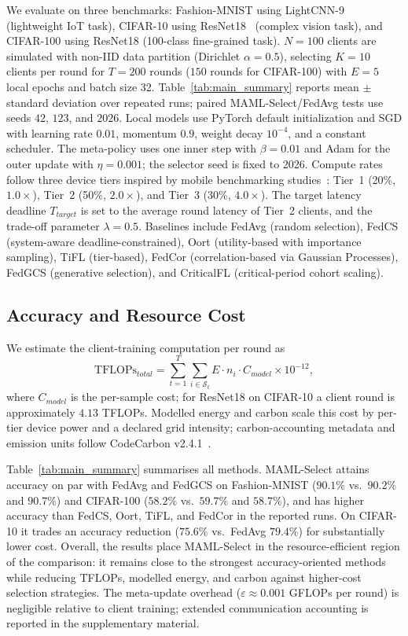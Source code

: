 \documentclass[journal]{IEEEtran}
\newcommand{\revision}[1]{#1}
\begin{document}
\revision{We evaluate on three benchmarks: Fashion-MNIST using LightCNN-9~\cite{wu2018light} (lightweight IoT task), CIFAR-10 using ResNet18~\cite{he2016deep} (complex vision task), and CIFAR-100 using ResNet18 (100-class fine-grained task).} $N = 100$ clients are simulated with non-IID data partition (Dirichlet $\alpha = 0.5$), selecting $K = 10$ clients per round for $T = 200$ rounds (\revision{$150$ rounds for CIFAR-100}) with $E = 5$ local epochs and batch size 32. \revision{Table~\ref{tab:main_summary} reports mean $\pm$ standard deviation over repeated runs; paired MAML-Select/FedAvg tests use seeds $42$, $123$, and $2026$.} \revision{Local models use PyTorch default initialization and SGD with learning rate $0.01$, momentum $0.9$, weight decay $10^{-4}$, and a constant scheduler. The meta-policy uses one inner step with $\beta=0.01$ and Adam for the outer update with $\eta=0.001$; the selector seed is fixed to 2026.} \revision{Compute rates follow three device tiers inspired by mobile benchmarking studies~\cite{ignatov2018ai}: Tier~1 (20\%, $1.0\times$), Tier~2 (50\%, $2.0\times$), and Tier~3 (30\%, $4.0\times$).} The target latency deadline $T_{target}$ is set to the average round latency of Tier~2 clients, and the trade-off parameter $\lambda = 0.5$. \revision{Baselines include FedAvg (random selection), FedCS (system-aware deadline-constrained), Oort (utility-based with importance sampling), TiFL (tier-based), FedCor (correlation-based via Gaussian Processes), FedGCS (generative selection), and CriticalFL (critical-period cohort scaling).}

\subsection{\revision{Accuracy and Resource Cost}}
\revision{We estimate the client-training computation per round as}
\begin{equation}
	\text{TFLOPs}_{total} = \sum_{t=1}^{T} \sum_{i \in \mathcal{S}_t} E \cdot n_i \cdot C_{model} \times 10^{-12},
	\label{eq:tflops}
\end{equation}
\revision{where $C_{model}$ is the per-sample cost; for ResNet18 on CIFAR-10 a client round is approximately $4.13$ TFLOPs. Modelled energy and carbon scale this cost by per-tier device power and a declared grid intensity; carbon-accounting metadata and emission units follow CodeCarbon v2.4.1~\cite{courty2024codecarbon}.}

\revision{Table~\ref{tab:main_summary} summarises all methods. MAML-Select attains accuracy on par with FedAvg and FedGCS on Fashion-MNIST ($90.1\%$ vs.\ $90.2\%$ and $90.7\%$) and CIFAR-100 ($58.2\%$ vs.\ $59.7\%$ and $58.7\%$), and has higher accuracy than FedCS, Oort, TiFL, and FedCor in the reported runs. On CIFAR-10 it trades an accuracy reduction ($75.6\%$ vs.\ FedAvg $79.4\%$) for substantially lower cost. Overall, the results place MAML-Select in the resource-efficient region of the comparison: it remains close to the strongest accuracy-oriented methods while reducing TFLOPs, modelled energy, and carbon against higher-cost selection strategies. The meta-update overhead ($\varepsilon \approx 0.001$ GFLOPs per round) is negligible relative to client training; extended communication accounting is reported in the supplementary material.}
\end{document}
